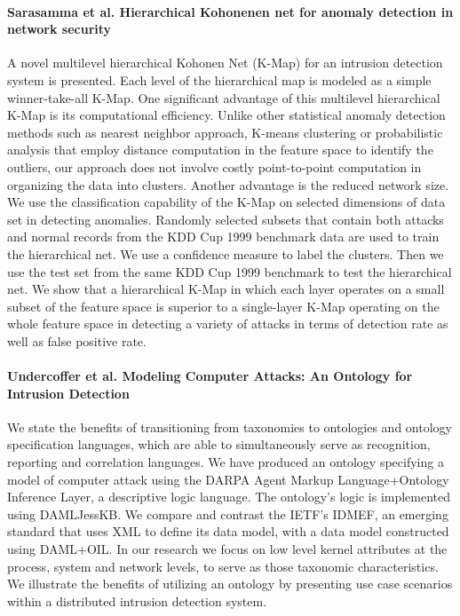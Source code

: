 \paragraph*{Sarasamma et al. Hierarchical Kohonenen net for anomaly detection in network security}
\cite{sarasamma2005hierarchical}
A novel multilevel hierarchical Kohonen Net (K-Map) for an intrusion detection system is presented. Each level of the hierarchical map is modeled as a simple winner-take-all K-Map. One significant advantage of this multilevel hierarchical K-Map is its computational efficiency. Unlike other statistical anomaly detection methods such as nearest neighbor approach, K-means clustering or probabilistic analysis that employ distance computation in the feature space to identify the outliers, our approach does not involve costly point-to-point computation in organizing the data into clusters. Another advantage is the reduced network size. We use the classification capability of the K-Map on selected dimensions of data set in detecting anomalies. Randomly selected subsets that contain both attacks and normal records from the KDD Cup 1999 benchmark data are used to train the hierarchical net. We use a confidence measure to label the clusters. Then we use the test set from the same KDD Cup 1999 benchmark to test the hierarchical net. We show that a hierarchical K-Map in which each layer operates on a small subset of the feature space is superior to a single-layer K-Map operating on the whole feature space in detecting a variety of attacks in terms of detection rate as well as false positive rate.


\paragraph*{Undercoffer et al. Modeling Computer Attacks: An Ontology for Intrusion Detection}
\cite{undercoffer2003modeling}
We state the benefits of transitioning from taxonomies to ontologies and ontology specification languages, which are able to simultaneously serve as recognition, reporting and correlation languages. We have produced an ontology specifying a model of computer attack using the DARPA Agent Markup Language+Ontology Inference Layer, a descriptive logic language. The ontology’s logic is implemented using DAMLJessKB. We compare and contrast the IETF’s IDMEF, an emerging standard that uses XML to define its data model, with a data model constructed using DAML+OIL. In our research we focus on low level kernel attributes at the process, system and network levels, to serve as those taxonomic characteristics. We illustrate the benefits of utilizing an ontology by presenting use case scenarios within a distributed intrusion detection system.


